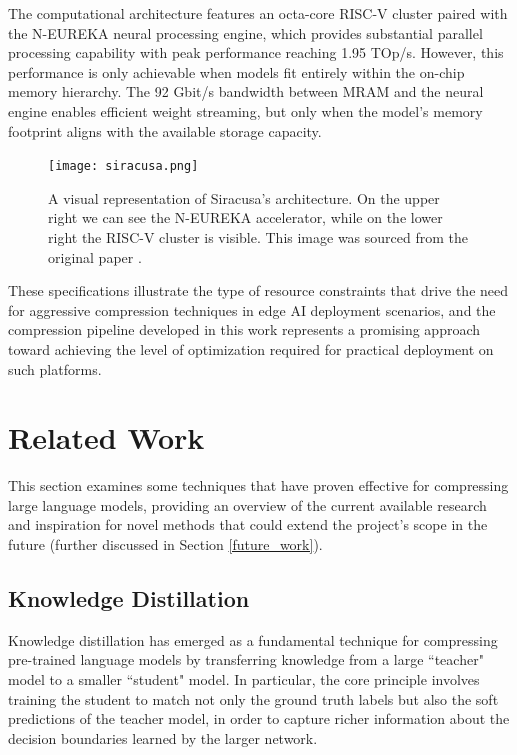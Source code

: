 The computational architecture features an octa-core RISC-V cluster paired with the N-EUREKA neural processing engine, which provides substantial parallel processing capability with peak performance reaching 1.95 TOp/s. However, this performance is only achievable when models fit entirely within the on-chip memory hierarchy. The 92 Gbit/s bandwidth between MRAM and the neural engine enables efficient weight streaming, but only when the model's memory footprint aligns with the available storage capacity.

\begin{figure}[htbp]
    \centering
    \texttt{[image: siracusa.png]}
    \caption[The Architecture of Siracusa]{A visual representation of Siracusa's architecture. On the upper right we can see the N-EUREKA accelerator, while on the lower right the RISC-V cluster is visible. This image was sourced from the original paper \cite{target_hardware}.}
    \label{fig:siracusa}
\end{figure}

These specifications illustrate the type of resource constraints that drive the need for aggressive compression techniques in edge AI deployment scenarios, and the compression pipeline developed in this work represents a promising approach toward achieving the level of optimization required for practical deployment on such platforms.

\section{Related Work}

This section examines some techniques that have proven effective for compressing large language models, providing an overview of the current available research and inspiration for novel methods that could extend the project's scope in the future (further discussed in Section \ref{future_work}).

\subsection{Knowledge Distillation} \label{distillation_paragraph}

Knowledge distillation \cite{distillation} has emerged as a fundamental technique for compressing pre-trained language models by transferring knowledge from a large ``teacher" model to a smaller ``student" model. In particular, the core principle involves training the student to match not only the ground truth labels but also the soft predictions of the teacher model, in order to capture richer information about the decision boundaries learned by the larger network.

